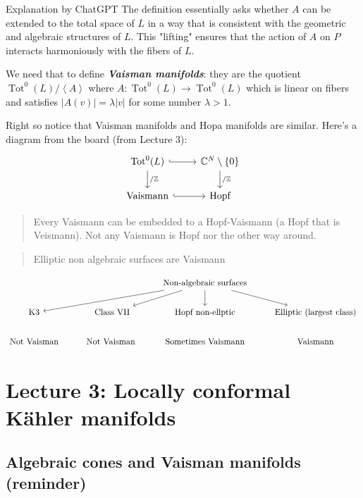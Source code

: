\begin{thing6}{Explanation by ChatGPT}\leavevmode
The definition essentially asks whether \(A\) can be extended to the total space of \(L\) in a way that is consistent with the geometric and algebraic structures of \(L\). This "lifting" ensures that the action of \(A\) on \(P\) interacts harmoniously with the fibers of \(L\).
\end{thing6}

We need that to define \textit{\textbf{Vaisman manifolds}}: they are the quotient \(\operatorname{Tot}^0(L)/\left<A\right>\) where \(A: \operatorname{Tot}^0(L)\to \operatorname{Tot}^0(L)\) which is linear on fibers and satisfies \(|A(v)|=\lambda|v|\) for some number \(\lambda>1\).

Right so notice that Vaisman manifolds and Hopa manifolds are similar. Here's a diagram from the board (from Lecture 3):
\[\begin{tikzcd}
	\operatorname{Tot}^0(L)\arrow[r,hook]\arrow[d,"/\mathbb{Z}"]&\mathbb{C}^N\setminus\{0\}\arrow[d,"/\mathbb{Z}"]\\\text{Vaismann} \arrow[r,hook]&\text{Hopf} 
\end{tikzcd}\]

\begin{quotation}
	Every Vaismann can be embedded to a Hopf-Vaismann (a Hopf that is Veismann). Not any Vaismann is Hopf nor the other way around.
\end{quotation}

\begin{quotation}
	Elliptic non algebraic surfaces are Vaismann
\end{quotation}

\[\begin{tikzcd}
	&  &  \text{Non-algebraic surfaces} \arrow[dll]\arrow[dl]\arrow[d]\arrow[dr]\\
	\text{K3} & \text{ Class VII} &\text{Hopf non-ellptic}&\text{Elliptic (largest class)}  \\
	\text{Not Vaisman} &\text{Not Vaisman} &\text{Sometimes Vaismann} &\text{Vaismann} 
\end{tikzcd}\]




\section{Lecture 3:  Locally conformal Kähler manifolds}

\subsection{Algebraic cones and Vaisman manifolds (reminder)}

